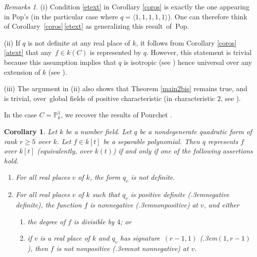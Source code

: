 \documentclass{amsart}
\newtheorem{cor}[thm]{Corollary}
\theoremstyle{definition}
\theoremstyle{remark}
\newtheorem{rems}[thm]{Remarks}
\numberwithin{equation}{section}
\def\resp {\text{resp.}\kern.3em}
\def\P{\mathbb P}
\begin{document}
 \begin{rems}
 \label{remmain2}
 (i) 
 Condition \ref{etext} in Corollary \ref{coros} is exactly the one appearing in Pop's \cite[Theorem 2.5\,(1)]{Pop} (in the particular case where $q=\langle 1,1,1,1,1\rangle$). One can therefore think of Corollary~\ref{coros}\,\ref{etext} as generalizing this result~of~Pop.
 
 (ii)
If $q$ is not definite at any real place of $k$, it follows from Corollary \ref{coros}\,\ref{atext} that any~$f\in k(C)$ is represented by $q$. However, this statement is trivial because this assumption implies that $q$ is isotropic (see \cite[VI.3.5]{Lam}) hence universal over any extension of $k$ (see \cite[I.3.4]{Lam}).
 
 (iii)
 The argument in (ii) also shows that Theorem \ref{main2bis} remains true, and is trivial, over~global fields of positive characteristic (in characteristic $2$, see \cite[Proposition~3.1]{Pollak}).
 \end{rems}
 
In the case $C=\P^1_k$, we recover the results of Pourchet \cite[Corollaire 1 p.\,98]{Pourchet}.

\begin{cor}
\label{coroPourchet}
Let $k$ be a number field. Let $q$ be a nondegenerate quadratic form of rank $r\geq 5$ over $k$. Let $f\in k[t]$ be a separable polynomial. Then $q$ represents $f$ over $k[t]$ (equivalently, over $k(t)$) if and only if one of the following assertions hold.
\begin{enumerate}[label=(\roman*)] 
\item
\label{Pi}
For all real places $v$ of $k$, the form $q_v$ is not definite.
\item
\label{Pii}
For all real places $v$ of $k$ such that $q_v$ is positive definite (\resp negative definite), the function $f$ is nonnegative (\resp nonpositive) at $v$, and either
\begin{enumerate}[label=(\alph*)] 
\item
\label{Pa}
the degree of $f$ is divisible by $4$; or
\item
\label{Pb}
if $v$ is a real place of $k$ and $q_v$ has signature~$(r-1,1)$ (\resp $(1,r-1)$), then $f$ is not nonpositive (\resp not nonnegative) at $v$.
\end{enumerate}
\end{enumerate}
\end{cor}
\end{document}

